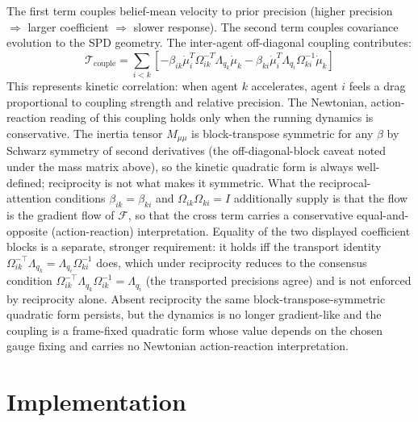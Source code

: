 \documentclass[11pt]{article}
\begin{document}
The first term couples belief-mean velocity to prior precision (higher precision $\Rightarrow$ larger coefficient $\Rightarrow$ slower response). The second term couples covariance evolution to the SPD geometry. The inter-agent off-diagonal coupling contributes:
\begin{equation}
\mathcal{T}_{\mathrm{couple}} = \sum_{i < k}\left[-\beta_{ik}\dot{\mu}_i^T \Omega_{ik}^{-T}\Lambda_{q_k}\dot{\mu}_k - \beta_{ki}\dot{\mu}_i^T \Lambda_{q_i}\Omega_{ki}^{-1} \dot{\mu}_k\right]
\end{equation}
This represents kinetic correlation: when agent $k$ accelerates, agent $i$ feels a drag proportional to coupling strength and relative precision. The Newtonian, action-reaction reading of this coupling holds only when the running dynamics is conservative. The inertia tensor $M_{\mu\mu}$ is block-transpose symmetric for any $\beta$ by Schwarz symmetry of second derivatives (the off-diagonal-block caveat noted under the mass matrix above), so the kinetic quadratic form is always well-defined; reciprocity is not what makes it symmetric. What the reciprocal-attention conditions $\beta_{ik} = \beta_{ki}$ and $\Omega_{ik}\Omega_{ki} = I$ additionally supply is that the flow is the gradient flow of $\mathcal{F}$, so that the cross term carries a conservative equal-and-opposite (action-reaction) interpretation. Equality of the two displayed coefficient blocks is a separate, stronger requirement: it holds iff the transport identity $\Omega_{ik}^{-\top}\Lambda_{q_k} = \Lambda_{q_i}\Omega_{ki}^{-1}$ does, which under reciprocity reduces to the consensus condition $\Omega_{ik}^{-\top}\Lambda_{q_k}\Omega_{ik}^{-1} = \Lambda_{q_i}$ (the transported precisions agree) and is not enforced by reciprocity alone. Absent reciprocity the same block-transpose-symmetric quadratic form persists, but the dynamics is no longer gradient-like and the coupling is a frame-fixed quadratic form whose value depends on the chosen gauge fixing and carries no Newtonian action-reaction interpretation.

\section{Implementation}
\label{sec:implementation}
\end{document}
